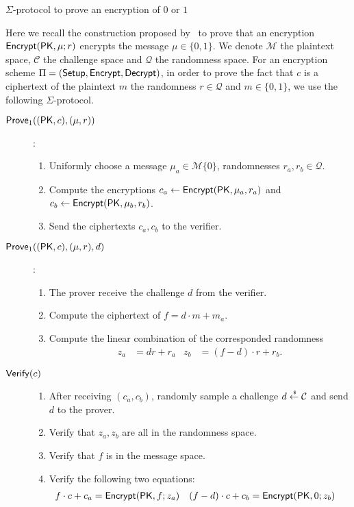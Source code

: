 \begin{section}{$\Sigma$-protocol to prove an encryption of $0$ or $1$~\cite{DBLP:conf/pkc/ChaidosG15}~\label{sigma}}

  Here we recall the construction proposed by~\cite{DBLP:conf/pkc/ChaidosG15} to prove that an encryption ${\mathsf{Encrypt}}(\mathsf{PK},\mu; r)$ encrypts the message $\mu \in \{0,1\}$.
  We denote $\mathcal{M}$ the plaintext space, $\mathcal{C}$ the challenge space and $\mathcal{Q}$ the randomness space.
  For an encryption scheme $\Pi = ({\mathsf{Setup}}, {\mathsf{Encrypt}}, {\mathsf{Decrypt}})$,
  in order to prove the fact that $c$ is a ciphertext of the plaintext $m$ \wrt the randomness $r \in \mathcal{Q}$ and $m \in \{0,1\}$,
  we use the following $\Sigma$-protocol.

  \begin{description}
    \item[${\mathsf{Prove}}_1((\mathsf{PK}, c), (\mu, r))$]:
    \begin{enumerate}
      \item Uniformly choose a message $\mu_a \in \mathcal{M} \{0\}$, randomnesses $r_a, r_b \in \mathcal{Q}$.
      \item Compute the encryptions $c_a \gets {\mathsf{Encrypt}}(\mathsf{PK}, \mu_a, r_a)$ and $c_b \gets {\mathsf{Encrypt}}(\mathsf{PK}, \mu_b, r_b)$.
      \item Send the ciphertexts $c_a, c_b$ to the verifier.
    \end{enumerate}
    \item[${\mathsf{Prove}}_1((\mathsf{PK}, c), (\mu, r), d)$]:
    \begin{enumerate}
      \item The prover receive the challenge $d$ from the verifier.
      \item Compute the ciphertext of $f = d \cdot m + m_a$.
      \item Compute the linear combination of the corresponded randomness
      \begin{align*}
        z_a &= d r + r_a  & z_b &= (f-d) \cdot r + r_b.
      \end{align*}
    \end{enumerate}
  \item[${\mathsf{Verify}}(c)$]
    \begin{enumerate}
    \item After receiving $(c_a, c_b)$, randomly sample a challenge $ d \stackrel{{\scriptscriptstyle \mkern4mu \$}}{\gets} \mathcal{C}$ and send $d$ to the prover.
    \item Verify that $z_a, z_b$ are all in the randomness space.
    \item Verify that $f$ is in the message space.
    \item Verify the following two equations:
      \begin{align*}
        f \cdot c + c_a &= {\mathsf{Encrypt}}(\mathsf{PK}, f; z_a) &  (f-d) \cdot c + c_b &= {\mathsf{Encrypt}}(\mathsf{PK}, 0; z_b)
      \end{align*}
    \end{enumerate}
  \end{description}



\end{section}

